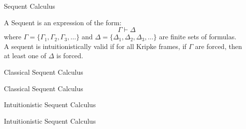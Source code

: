 \documentclass{beamer}
\begin{document}
\begin{frame}{Sequent Calculus}

    \begin{block}{}
        A Sequent is an expression of the form:
        \[
        \Gamma \vdash \Delta
        \]
        where \(\Gamma = \{\Gamma_1, \Gamma_2, \Gamma_3, \dots\}\) and \(\Delta = \{\Delta_1, \Delta_2, \Delta_3, \dots\}\) are finite sets of formulas. \\
        A sequent is intuitionistically valid if for all Kripke frames, if \(\Gamma\) are forced, then at least one of \(\Delta\) is forced.
    
    \end{block}
\end{frame}




\begin{frame}{Classical Sequent Calculus}
    \tiny{
    \RulesClassicalSequentCalculusSmall
    }
\end{frame}


\begin{frame}{Classical Sequent Calculus}
    \RulesClassicalSequentCalculusSmallBF
\end{frame}



\begin{frame}{Intuitionistic Sequent Calculus}
    \tiny{
    \RulesIntuitionisticSequentCalculusSmall
    }
\end{frame}


\begin{frame}{Intuitionistic Sequent Calculus}
    \tiny{
    \RulesIntuitionisticSequentCalculusSmallBF
    }
\end{frame}
\end{document}
